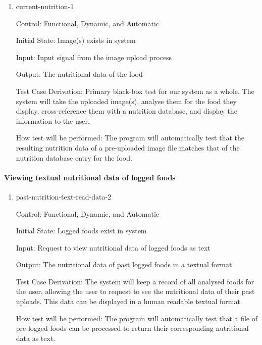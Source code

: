 \documentclass[12pt, titlepage]{article}
\begin{document}
	\begin{enumerate}
		
		\item{current-nutrition-1\\}
		
		Control: Functional, Dynamic, and Automatic
		
		Initial State: Image(s) exists in system
		
		Input: Input signal from the image upload process
		
		Output: The nutritional data of the food
		
		Test Case Derivation: Primary black-box test for our system as a whole. The system will take the uploaded image(s), analyse them for the food they display, cross-reference them with a nutrition database, and display the information to the user.
		
		How test will be performed: The program will automatically test that the resulting nutrition data of a pre-uploaded image file matches that of the nutrition database entry for the food.
		
	\end{enumerate}
	
	\paragraph{Viewing textual nutritional data of logged foods}
	
	\begin{enumerate}
		
		\item{past-nutrition-text-read-data-2\\}
		
		Control: Functional, Dynamic, and Automatic
		
		Initial State: Logged foods exist in system
		
		Input: Request to view nutritional data of logged foods as text
		
		Output: The nutritional data of past logged foods in a textual format
		
		Test Case Derivation: The system will keep a record of all analysed foods for the user, allowing the user to request to see the nutritional data of their past uploads. This data can be displayed in a human readable textual format.
		
		How test will be performed: The program will automatically test that a file of pre-logged foods can be processed to return their corresponding nutritional data as text.
			
	\end{enumerate}
\end{document}
